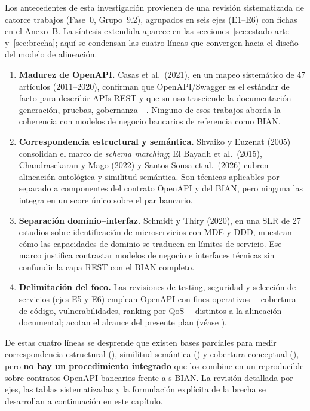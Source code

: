 Los antecedentes de esta investigación provienen de una revisión sistematizada de catorce trabajos
(Fase~0, Grupo~9.2), agrupados en seis ejes (E1--E6) con fichas en el Anexo~B. La síntesis
extendida aparece en las secciones~\ref{sec:estado-arte} y~\ref{sec:brecha}; aquí se condensan las
cuatro líneas que convergen hacia el diseño del modelo de alineación.

\begin{enumerate}
  \item \textbf{Madurez de OpenAPI.} Casas et al.\ (2021), en un mapeo sistemático de 47 artículos
        (2011--2020), confirman que OpenAPI/Swagger es el estándar de facto para describir APIs REST
        y que su uso trasciende la documentación ---generación, pruebas, gobernanza---. Ninguno de
        esos trabajos aborda la coherencia con modelos de negocio bancarios de referencia como BIAN.
  \item \textbf{Correspondencia estructural y semántica.} Shvaiko y Euzenat (2005) consolidan el
        marco de \textit{schema matching}; El Bayadh et al.\ (2015), Chandrasekaran y Mago (2022) y
        Santos Sousa et al.\ (2026) cubren alineación ontológica y similitud semántica. Son técnicas
        aplicables por separado a componentes del contrato OpenAPI y del \ServiceDomain{} BIAN, pero
        ninguna las integra en un score único sobre el par bancario.
  \item \textbf{Separación dominio--interfaz.} Schmidt y Thiry (2020), en una SLR de 27 estudios
        sobre identificación de microservicios con MDE y DDD, muestran cómo las capacidades de
        dominio se traducen en límites de servicio. Ese marco justifica contrastar modelos de negocio
        e interfaces técnicas sin confundir la capa REST con el \ServiceDomain{} BIAN completo.
  \item \textbf{Delimitación del foco.} Las revisiones de testing, seguridad y selección de servicios
        (ejes E5 y E6) emplean OpenAPI con fines operativos ---cobertura de código, vulnerabilidades,
        ranking por QoS--- distintos a la alineación documental; acotan el alcance del presente plan
        (véase ).
\end{enumerate}

De estas cuatro líneas se desprende que existen bases parciales para medir correspondencia
estructural (\StructuralScore{}), similitud semántica (\SemanticScore{}) y cobertura conceptual
(\CoverageScore{}), pero \textbf{no hay un procedimiento integrado} que los combine en un
\AlignmentScore{} reproducible sobre contratos OpenAPI bancarios frente a \ServiceDomain{}s BIAN. La
revisión detallada por ejes, las tablas sistematizadas y la formulación explícita de la brecha se
desarrollan a continuación en este capítulo.
